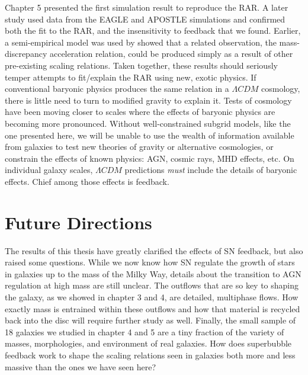 Chapter 5 presented the first simulation result to reproduce the
\citet{McGaugh2016} RAR.  A later study \citep{Ludlow2016} used data from the
EAGLE \citep{Schaye2015} and APOSTLE \citep{Sawala2016} simulations and
confirmed both the fit to the RAR, and the insensitivity to feedback that we
found.  Earlier, a semi-empirical model was used by \citet{DiCintio2016} showed
that a related observation, the mass-discrepancy acceleration relation, could be
produced simply as a result of other pre-existing scaling relations.  Taken
together, these results should seriously temper attempts to fit/explain the RAR
using new, exotic physics.  If conventional baryonic physics produces the same
relation in a $\Lambda CDM$ cosmology, there is little need to turn to modified
gravity \citep{Moffat2016,Verlinde2016,Burrage2016} to explain it.  Tests of
cosmology have been moving closer to scales where the effects of baryonic
physics are becoming more pronounced.  Without well-constrained subgrid models,
like the one presented here, we will be unable to use the wealth of information
available from galaxies to test new theories of gravity or alternative
cosmologies, or constrain the effects of known physics: AGN, cosmic rays,
MHD effects, etc.  On individual galaxy scales, $\Lambda CDM$ predictions {\it must}
include the details of baryonic effects.  Chief among those effects is feedback.

\section{Future Directions}
The results of this thesis have greatly clarified the effects of SN feedback,
but also raised some questions.  While we now know how SN regulate the growth of
stars in galaxies up to the mass of the Milky Way, details about the transition
to AGN regulation at high mass are still unclear.  The outflows that are so key
to shaping the galaxy, as we showed in chapter 3 and 4, are detailed, multiphase
flows.  How exactly mass is entrained within these outflows and how that
material is recycled back into the disc will require further study as well.
Finally, the small sample of 18 galaxies we studied in chapter 4 and 5 are a
tiny fraction of the variety of masses, morphologies, and environment of real
galaxies.  How does superbubble feedback work to shape the scaling relations
seen in galaxies both more and less massive than the ones we have seen here?

